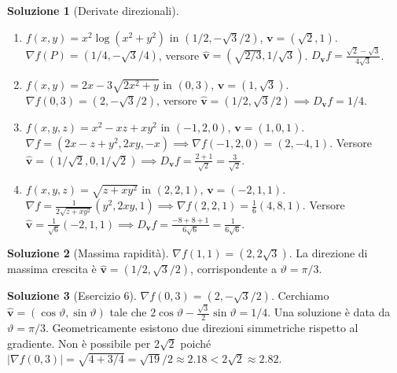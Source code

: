 \documentclass[12pt,a4paper]{article}
\theoremstyle{definition}
\newtheorem{sol}{Soluzione}
\begin{document}
\begin{sol}[Derivate direzionali]
    \begin{enumerate}
        \item $f(x,y) = x^2 \log(x^2+y^2)$ in $(1/2, -\sqrt{3}/2)$, $\mathbf{v} = (\sqrt{2}, 1)$.
              $\nabla f(P) = (1/4, -\sqrt{3}/4)$, versore $\hat{\mathbf{v}} = (\sqrt{2/3}, 1/\sqrt{3})$.
              $D_{\mathbf{v}} f = \frac{\sqrt{2}-\sqrt{3}}{4\sqrt{3}}$.
        \item $f(x,y) = 2x - 3\sqrt{2x^2+y}$ in $(0,3)$, $\mathbf{v} = (1, \sqrt{3})$.
              $\nabla f(0,3) = (2, -\sqrt{3}/2)$, versore $\hat{\mathbf{v}} = (1/2, \sqrt{3}/2) \implies D_{\mathbf{v}} f = 1/4$.
        \item $f(x,y,z) = x^2 - xz + xy^2$ in $(-1,2,0)$, $\mathbf{v} = (1, 0, 1)$.
              $\nabla f = (2x-z+y^2, 2xy, -x) \implies \nabla f(-1,2,0) = (2, -4, 1)$.
              Versore $\hat{\mathbf{v}} = (1/\sqrt{2}, 0, 1/\sqrt{2}) \implies D_{\mathbf{v}} f = \frac{2+1}{\sqrt{2}} = \frac{3}{\sqrt{2}}$.
        \item $f(x,y,z) = \sqrt{z + xy^2}$ in $(2,2,1)$, $\mathbf{v} = (-2, 1, 1)$.
              $\nabla f = \frac{1}{2\sqrt{z+xy^2}}(y^2, 2xy, 1) \implies \nabla f(2,2,1) = \frac{1}{6}(4, 8, 1)$.
              Versore $\hat{\mathbf{v}} = \frac{1}{\sqrt{6}}(-2, 1, 1) \implies D_{\mathbf{v}} f = \frac{-8+8+1}{6\sqrt{6}} = \frac{1}{6\sqrt{6}}$.
    \end{enumerate}
\end{sol}

\begin{sol}[Massima rapidità]
    $\nabla f(1,1) = (2, 2\sqrt{3})$. La direzione di massima crescita è $\hat{\mathbf{v}} = (1/2, \sqrt{3}/2)$, corrispondente a $\vartheta = \pi/3$.
\end{sol}

\begin{sol}[Esercizio 6]
    $\nabla f(0,3) = (2, -\sqrt{3}/2)$. Cerchiamo $\hat{\mathbf{v}} = (\cos \vartheta, \sin \vartheta)$ tale che $2\cos \vartheta - \frac{\sqrt{3}}{2}\sin \vartheta = 1/4$.
    Una soluzione è data da $\vartheta = \pi/3$. Geometricamente esistono due direzioni simmetriche rispetto al gradiente.
    Non è possibile per $2\sqrt{2}$ poiché $|\nabla f(0,3)| = \sqrt{4 + 3/4} = \sqrt{19}/2 \approx 2.18 < 2\sqrt{2} \approx 2.82$.
\end{sol}
\end{document}
